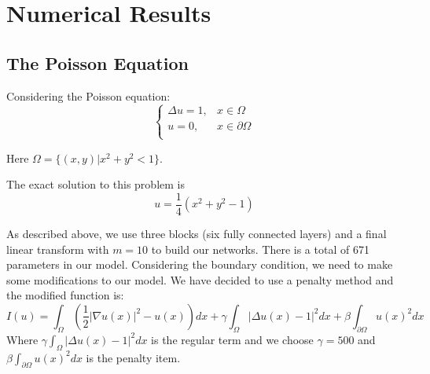 \documentclass{article}
\begin{document}
\section{Numerical Results}

\subsection{The Poisson Equation}
\par Considering the Poisson equation:
\begin{equation}
\left\{
\begin{aligned}
 \Delta u=1,& x\in \Omega \\
 u=0, &x\in \partial \Omega \\
 \end{aligned}
\right.
\end{equation}

Here $\Omega =\{(x,y)| x^2+y^2<1\}$.
\par The exact solution to this problem is 
\begin{equation}
u=\frac{1}{4}(x^2+y^2-1)
\end{equation}

\par As described above, we use three blocks (six fully connected layers) and a final linear transform with $m=10$ to build our networks. There is a total of 671 parameters in our model. Considering the boundary condition, we need to make some modifications to our model. We have decided to use a penalty method and the modified function is:
\begin{equation}
I(u)=\int_{\Omega}\left(\frac{1}{2}|\nabla u(x)|^2-u(x)\right)dx+\gamma\int_{\Omega}|\Delta u(x) - 1|^2dx+\beta\int_{\partial \Omega}u(x)^2dx
\end{equation}
Where $\gamma\int_{\Omega}|\Delta u(x) - 1|^2dx$ is the regular term and we choose $\gamma=500$ and $\beta\int_{\partial \Omega}u(x)^2dx$ is the penalty item.
\end{document}
